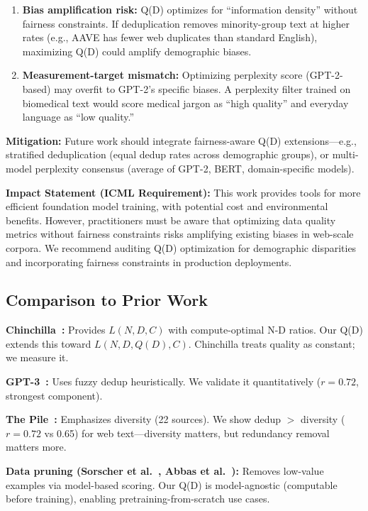 \begin{enumerate}
\item \textbf{Bias amplification risk:} Q(D) optimizes for ``information density'' without fairness constraints. If deduplication removes minority-group text at higher rates (e.g., AAVE has fewer web duplicates than standard English), maximizing Q(D) could amplify demographic biases.

\item \textbf{Measurement-target mismatch:} Optimizing perplexity score (GPT-2-based) may overfit to GPT-2's specific biases. A perplexity filter trained on biomedical text would score medical jargon as ``high quality'' and everyday language as ``low quality.''
\end{enumerate}

\textbf{Mitigation:} Future work should integrate fairness-aware Q(D) extensions---e.g., stratified deduplication (equal dedup rates across demographic groups), or multi-model perplexity consensus (average of GPT-2, BERT, domain-specific models).

\textbf{Impact Statement (ICML Requirement):} This work provides tools for more efficient foundation model training, with potential cost and environmental benefits. However, practitioners must be aware that optimizing data quality metrics without fairness constraints risks amplifying existing biases in web-scale corpora. We recommend auditing Q(D) optimization for demographic disparities and incorporating fairness constraints in production deployments.

\subsection{Comparison to Prior Work}

\textbf{Chinchilla~\cite{hoffmann2022training}:} Provides $L(N, D, C)$ with compute-optimal N-D ratios. Our Q(D) extends this toward $L(N, D, Q(D), C)$. Chinchilla treats quality as constant; we measure it.

\textbf{GPT-3~\cite{brown2020language}:} Uses fuzzy dedup heuristically. We validate it quantitatively ($r=0.72$, strongest component).

\textbf{The Pile~\cite{gao2020pile}:} Emphasizes diversity (22 sources). We show dedup $>$ diversity ($r=0.72$ vs 0.65) for web text---diversity matters, but redundancy removal matters more.

\textbf{Data pruning (Sorscher et al.~\cite{sorscher2022beyond}, Abbas et al.~\cite{abbas2023semdedup}):} Removes low-value examples via model-based scoring. Our Q(D) is model-agnostic (computable before training), enabling pretraining-from-scratch use cases.

